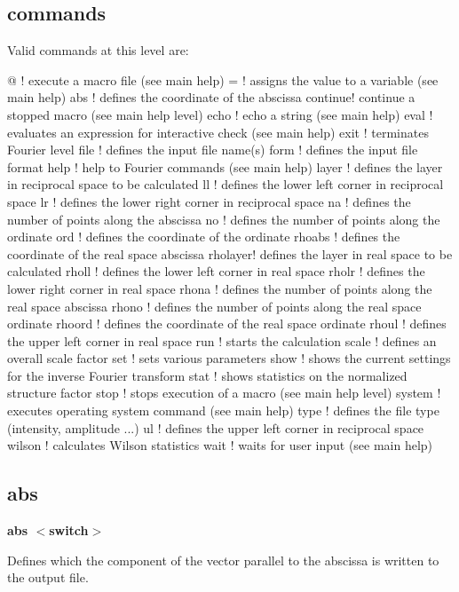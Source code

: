 \subsection*{commands}
Valid commands at this level are: 
\par
\begin{MacVerbatim}
@       ! execute a macro file (see main help)
=       ! assigns the value to a variable (see main help)
abs     ! defines the coordinate of the abscissa
continue! continue a stopped macro (see main help level)
echo    ! echo a string (see main help)
eval    ! evaluates an expression for interactive check (see main help)
exit    ! terminates Fourier level
file    ! defines the input file name(s)
form    ! defines the input file format
help    ! help to Fourier commands (see main help)
layer   ! defines the layer in reciprocal space to be calculated
ll      ! defines the lower left corner in reciprocal space
lr      ! defines the lower right corner in reciprocal space
na      ! defines the number of points along the abscissa
no      ! defines the number of points along the ordinate
ord     ! defines the coordinate of the ordinate
rhoabs  ! defines the coordinate of the real space abscissa
rholayer! defines the layer in real space to be calculated
rholl   ! defines the lower left corner in real space
rholr   ! defines the lower right corner in real space
rhona   ! defines the number of points along the real space abscissa
rhono   ! defines the number of points along the real space ordinate
rhoord  ! defines the coordinate of the real space ordinate
rhoul   ! defines the upper left corner in real space
run     ! starts the calculation
scale   ! defines an overall scale factor
set     ! sets various parameters
show    ! shows the current settings for the inverse Fourier transform
stat    ! shows statistics on the normalized structure factor
stop    ! stops execution of a macro (see main help level)
system  ! executes operating system command (see main help)
type    ! defines the file type (intensity, amplitude ...)
ul      ! defines the upper left corner in reciprocal space
wilson  ! calculates Wilson statistics
wait    ! waits for user input (see main help)
\end{MacVerbatim}
\subsection*{abs}
{\bf abs $ <$switch$> $ \par }
\par
\vspace{3pt}
Defines which the component of the vector parallel to the abscissa 
is written to the output file. 
